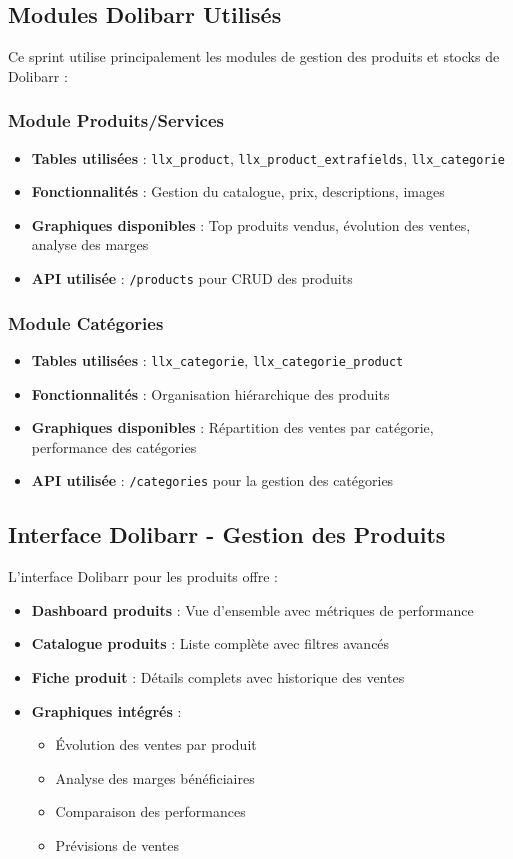 \documentclass[12pt,a4paper]{report}
\begin{document}
\subsection{Modules Dolibarr Utilisés}
Ce sprint utilise principalement les modules de gestion des produits et stocks de Dolibarr :

\subsubsection{Module Produits/Services}
\begin{itemize}
\item \textbf{Tables utilisées} : \texttt{llx\_product}, \texttt{llx\_product\_extrafields}, \texttt{llx\_categorie}
\item \textbf{Fonctionnalités} : Gestion du catalogue, prix, descriptions, images
\item \textbf{Graphiques disponibles} : Top produits vendus, évolution des ventes, analyse des marges
\item \textbf{API utilisée} : \texttt{/products} pour CRUD des produits
\end{itemize}

\subsubsection{Module Catégories}
\begin{itemize}
\item \textbf{Tables utilisées} : \texttt{llx\_categorie}, \texttt{llx\_categorie\_product}
\item \textbf{Fonctionnalités} : Organisation hiérarchique des produits
\item \textbf{Graphiques disponibles} : Répartition des ventes par catégorie, performance des catégories
\item \textbf{API utilisée} : \texttt{/categories} pour la gestion des catégories
\end{itemize}


\subsection{Interface Dolibarr - Gestion des Produits}
L'interface Dolibarr pour les produits offre :
\begin{itemize}
\item \textbf{Dashboard produits} : Vue d'ensemble avec métriques de performance
\item \textbf{Catalogue produits} : Liste complète avec filtres avancés
\item \textbf{Fiche produit} : Détails complets avec historique des ventes
\item \textbf{Graphiques intégrés} :
  \begin{itemize}
  \item Évolution des ventes par produit
  \item Analyse des marges bénéficiaires
  \item Comparaison des performances
  \item Prévisions de ventes
  \end{itemize}
\end{itemize}
\end{document}
